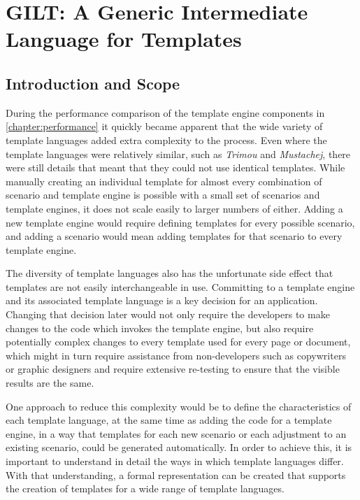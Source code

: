 \chapter{GILT: A Generic Intermediate Language for Templates}
\label{chapter:intermediate}

\section*{Introduction and Scope}

During the performance comparison of the template engine components in \autoref{chapter:performance} it quickly became apparent that the wide variety of template languages added extra complexity to the process. Even where the template languages were relatively similar, such as \emph{Trimou} and \emph{Mustachej}, there were still details that meant that they could not use identical templates. While manually creating an individual template for almost every combination of scenario and template engine is possible with a small set of scenarios and template engines, it does not scale easily to larger numbers of either. Adding a new template engine would require defining templates for every possible scenario, and adding a scenario would mean adding templates for that scenario to every template engine.

The diversity of template languages also has the unfortunate side effect that templates are not easily interchangeable in use. Committing to a template engine and its associated template language is a key decision for an application. Changing that decision later would not only require the developers to make changes to the code which invokes the template engine, but also require potentially complex changes to every template used for every page or document, which might in turn require assistance from non-developers such as copywriters or graphic designers and require extensive re-testing to ensure that the visible results are the same.

One approach to reduce this complexity would be to define the characteristics of each template language, at the same time as adding the code for a template engine, in a way that templates for each new scenario or each adjustment to an existing scenario, could be generated automatically. In order to achieve this, it is important to understand in detail the ways in which template languages differ. With that understanding, a formal representation can be created that supports the creation of templates for a wide range of template languages.


